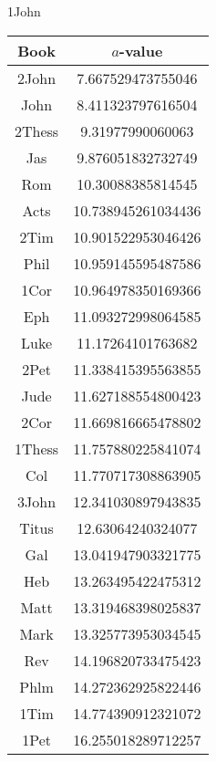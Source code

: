 \documentclass[12pt,letterpaper]{article}
\begin{document}
1John
\begin{longtable}{|c|c|}
\hline
 Book & $a$-value \\ \hline
2John & 7.667529473755046 \\ \hline
 John & 8.411323797616504 \\ \hline
 2Thess & 9.31977990060063 \\ \hline
 Jas & 9.876051832732749 \\ \hline
 Rom & 10.30088385814545 \\ \hline
 Acts & 10.738945261034436 \\ \hline
 2Tim & 10.901522953046426 \\ \hline
 Phil & 10.959145595487586 \\ \hline
 1Cor & 10.964978350169366 \\ \hline
 Eph & 11.093272998064585 \\ \hline
 Luke & 11.17264101763682 \\ \hline
 2Pet & 11.338415395563855 \\ \hline
 Jude & 11.627188554800423 \\ \hline
 2Cor & 11.669816665478802 \\ \hline
 1Thess & 11.757880225841074 \\ \hline
 Col & 11.770717308863905 \\ \hline
 3John & 12.341030897943835 \\ \hline
 Titus & 12.63064240324077 \\ \hline
 Gal & 13.041947903321775 \\ \hline
 Heb & 13.263495422475312 \\ \hline
 Matt & 13.319468398025837 \\ \hline
 Mark & 13.325773953034545 \\ \hline
 Rev & 14.196820733475423 \\ \hline
 Phlm & 14.272362925822446 \\ \hline
 1Tim & 14.774390912321072 \\ \hline
 1Pet & 16.255018289712257 \\ \hline 
\end{longtable}
\end{document}
